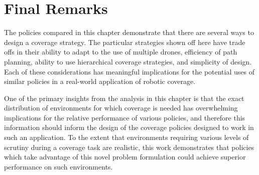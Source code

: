 \section{Final Remarks}

The policies compared in this chapter demonstrate that there are several ways to design a coverage strategy. The particular strategies shown off here have trade offs in their ability to adapt to the use of multiple drones, efficiency of path planning, ability to use hierarchical coverage strategies, and simplicity of design. Each of these considerations has meaningful implications for the potential uses of similar policies in a real-world application of robotic coverage.

One of the primary insights from the analysis in this chapter is that the exact distribution of environments for which coverage is needed has overwhelming implications for the relative performance of various policies, and therefore this information should inform the design of the coverage policies designed to work in such an application. To the extent that environments requiring various levels of scrutiny during a coverage task are realistic, this work demonstrates that policies which take advantage of this novel problem formulation could achieve superior performance on such environments.